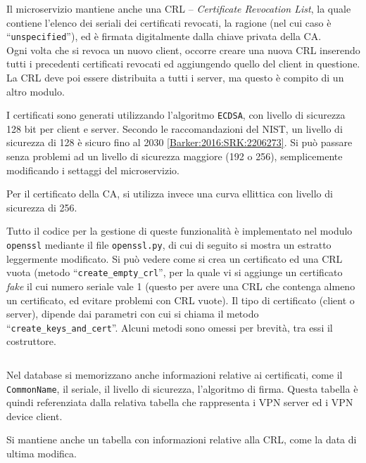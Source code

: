 Il microservizio mantiene anche una CRL -- \textit{Certificate Revocation List}, la quale
contiene l'elenco dei seriali dei certificati revocati, la ragione (nel cui caso è ``\texttt{unspecified}''),
ed è firmata digitalmente dalla chiave privata della CA.\\
Ogni volta che si revoca un nuovo client, occorre creare una nuova CRL inserendo tutti i
precedenti certificati revocati ed aggiungendo quello del client in questione. La CRL deve
poi essere distribuita 
a tutti i server, ma questo è compito di un altro modulo.

I certificati sono generati utilizzando l'algoritmo \texttt{ECDSA}, con livello di sicurezza
128 bit per client e server. Secondo le raccomandazioni del NIST, un livello di sicurezza di
128 è sicuro fino al 2030 \ref{Barker:2016:SRK:2206273}. Si può passare senza
problemi ad un livello di sicurezza maggiore (192 o 256), semplicemente modificando i settaggi
del microservizio.

Per il certificato della CA, si utilizza invece una curva ellittica con livello di sicurezza
di 256.


Tutto il codice per la gestione di queste funzionalità è implementato nel modulo \texttt{openssl}
mediante il file \texttt{openssl.py}, di cui di seguito si mostra un estratto leggermente
modificato.
Si può vedere come si crea un certificato ed una CRL vuota (metodo
``\texttt{create\_empty\_crl}'', per la quale vi
si aggiunge un certificato \textit{fake} il cui numero seriale vale 1 (questo per avere una
CRL che contenga almeno un certificato, ed evitare problemi con CRL vuote).
Il tipo di certificato (client o server), dipende dai parametri con cui si chiama il metodo
``\texttt{create\_keys\_and\_cert}''.
Alcuni metodi sono omessi per brevità, tra essi il costruttore.
\inputminted[tabsize=4, breaklines, fontsize=\footnotesize]{python}{code_samples/openssl.py}


Nel database si memorizzano anche informazioni relative ai certificati, come il
\texttt{CommonName}, il seriale, il livello di sicurezza, l'algoritmo
di firma. Questa tabella è quindi referenziata dalla relativa
tabella che rappresenta i VPN server ed i VPN device client.

Si mantiene anche un tabella con informazioni relative alla CRL, come la data di ultima
modifica.


